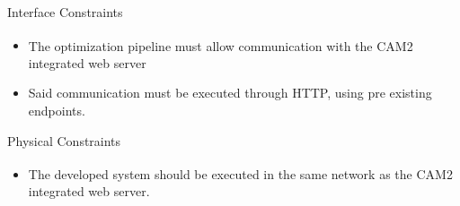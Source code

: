 \documentclass[10pt]{beamer}
\begin{document}
  \begin{frame}{Interface Constraints}
    \begin{itemize}
      \item The optimization pipeline must allow communication with the CAM2\textsuperscript{\textregistered} integrated web server
      \item Said communication must be executed through HTTP, using pre existing endpoints.
    \end{itemize}
  \end{frame}
  \begin{frame}{Physical Constraints}
    \begin{itemize}
      \item The developed system should be executed in the same network as the CAM2\textsuperscript{\textregistered} integrated web server.
    \end{itemize}
  \end{frame}
\end{document}
